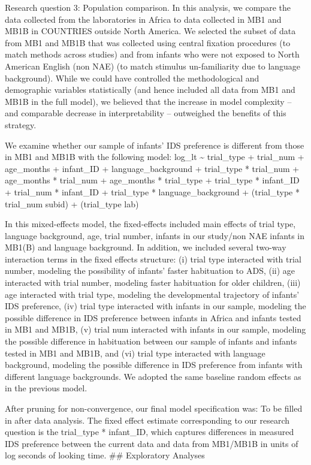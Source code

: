 \documentclass[
  ,man,floatsintext]{apa6}
\begin{document}
Research question 3: Population comparison. In this analysis, we compare the data collected from the laboratories in Africa to data collected in MB1 and MB1B in COUNTRIES outside North America. We selected the subset of data from MB1 and MB1B that was collected using central fixation procedures (to match methods across studies) and from infants who were not exposed to North American English (non NAE) (to match stimulus un-familiarity due to language background). While we could have controlled the methodological and demographic variables statistically (and hence included all data from MB1 and MB1B in the full model), we believed that the increase in model complexity -- and comparable decrease in interpretability -- outweighed the benefits of this strategy.

We examine whether our sample of infants' IDS preference is different from those in MB1 and MB1B with the following model:
log\_lt \textasciitilde{} trial\_type + trial\_num + age\_months + infant\_ID + language\_background +
trial\_type * trial\_num +
age\_months * trial\_num +
age\_months * trial\_type +
trial\_type * infant\_ID +
trial\_num * infant\_ID +
trial\_type * language\_background +
(trial\_type * trial\_num \textbar{} subid) +
(trial\_type \textbar{} lab)

In this mixed-effects model, the fixed-effects included main effects of trial type, language background, age, trial number, infants in our study/non NAE infants in MB1(B) and language background. In addition, we included several two-way interaction terms in the fixed effects structure: (i) trial type interacted with trial number, modeling the possibility of infants' faster habituation to ADS, (ii) age interacted with trial number, modeling faster habituation for older children, (iii) age interacted with trial type, modeling the developmental trajectory of infants' IDS preference, (iv) trial type interacted with infants in our sample, modeling the possible difference in IDS preference between infants in Africa and infants tested in MB1 and MB1B, (v) trial num interacted with infants in our sample, modeling the possible difference in habituation between our sample of infants and infants tested in MB1 and MB1B, and (vi) trial type interacted with language background, modeling the possible difference in IDS preference from infants with different language backgrounds. We adopted the same baseline random effects as in the previous model.

After pruning for non-convergence, our final model specification was: To be filled in after data analysis. The fixed effect estimate corresponding to our research question is the trial\_type * infant\_ID, which captures differences in measured IDS preference between the current data and data from MB1/MB1B in units of log seconds of looking time.
\#\# Exploratory Analyses
\end{document}
